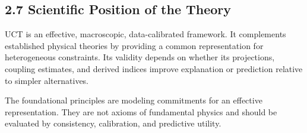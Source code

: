 \subsection{2.7 Scientific Position of the Theory}

UCT is an effective, macroscopic, data-calibrated framework. It complements established physical theories by providing a common representation for heterogeneous constraints. Its validity depends on whether its projections, coupling estimates, and derived indices improve explanation or prediction relative to simpler alternatives.

The foundational principles are modeling commitments for an effective representation. They are not axioms of fundamental physics and should be evaluated by consistency, calibration, and predictive utility.


